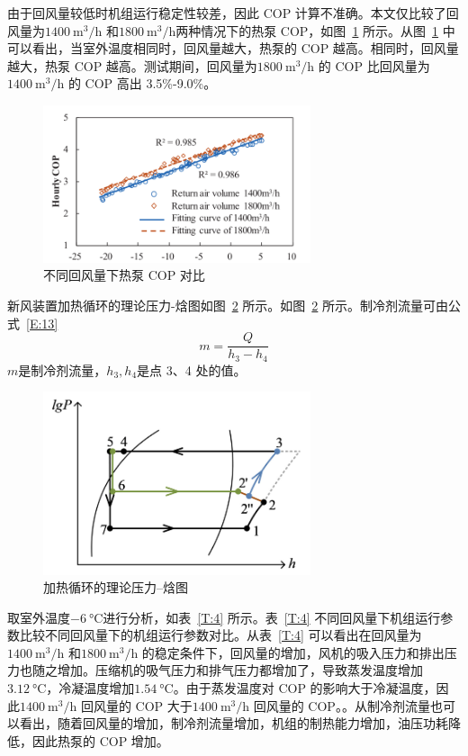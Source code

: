 由于回风量较低时机组运行稳定性较差，因此 COP 计算不准确。本文仅比较了回风量为$\qty{1400}{\m^3/\hour} $ 和$\qty{1800}{\m^3/\hour} $两种情况下的热泵 COP，如图~\ref{F:15} 所示。从图~\ref{F:15} 中可以看出，当室外温度相同时，回风量越大，热泵的 COP 越高。相同时，回风量越大，热泵 COP 越高。测试期间，回风量为$\qty{1800}{\m^3/\hour} $ 的 COP 比回风量为$\qty{1400}{\m^3/\hour} $ 的 COP 高出 3.5\%-9.0\%。

\begin{figure}[htbp]
	\centering
	\includegraphics[width=0.7\textwidth]{figure/figure_15}
	\caption{不同回风量下热泵 COP 对比}
	\label{F:15}
\end{figure}

新风装置加热循环的理论压力-焓图如图~\ref{F:16} 所示。如图~\ref{F:16} 所示。制冷剂流量可由公式~\ref{E:13}
\begin{equation}\label{E:13}
	m = \frac{Q}{h_3 - h_4} 
\end{equation}
$m$是制冷剂流量，$h_3, h_4$是点 3、4 处的值。

\begin{figure}[htbp]
	\centering
	\includegraphics[width=0.7\textwidth]{figure/figure_16}
	\caption{加热循环的理论压力--焓图}
	\label{F:16}
\end{figure}

取室外温度$\qty{-6}{\degreeCelsius} $进行分析，如表~\ref{T:4} 所示。表~\ref{T:4} 不同回风量下机组运行参数比较不同回风量下的机组运行参数对比。从表~\ref{T:4} 可以看出在回风量为$\qty{1400}{\m^3/\hour} $  和$\qty{1800}{\m^3/\hour} $  的稳定条件下，回风量的增加，风机的吸入压力和排出压力也随之增加。压缩机的吸气压力和排气压力都增加了，导致蒸发温度增加$\qty{3.12}{\degreeCelsius} $，冷凝温度增加$\qty{1.54}{\degreeCelsius} $。由于蒸发温度对 COP 的影响大于冷凝温度，因此$\qty{1400}{\m^3/\hour} $ 回风量的 COP 大于$\qty{1400}{\m^3/\hour} $ 回风量的 COP。。从制冷剂流量也可以看出，随着回风量的增加，制冷剂流量增加，机组的制热能力增加，油压功耗降低，因此热泵的 COP 增加。

